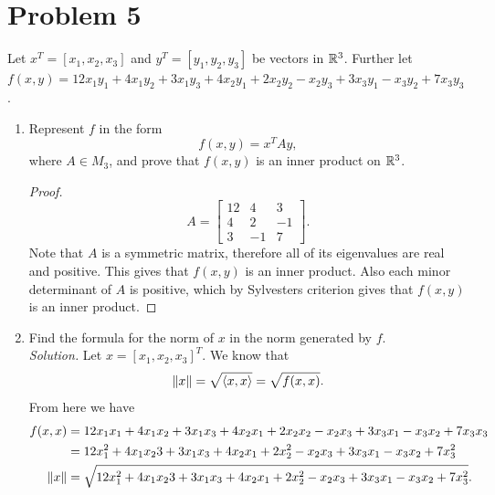 \documentclass[12pt]{article}
\begin{document}
\section*{Problem 5}
Let $x^T = [x_1, x_2, x_3]$ and $y^T = [y_1, y_2, y_3]$ be vectors in $\mathbb{R}^3$. Further let $f (x, y) = 12x_1y_1 +4x_1y_2 +3x_1y_3 +4x_2y_1 +2x_2y_2 -x_2y_3 +3x_3y_1 -x_3y_2 +7x_3y_3$.
\begin{enumerate}[label=(\alph*)]
    \item Represent $f$ in the form
    \[
        f(x,y)=x^TAy,
    \]
    where $A \in M_3$, and prove that $f (x, y)$ is an inner product on $\mathbb{R}^3$.
    \begin{proof}
        \[
            A=
            \begin{bmatrix}
                12&4&3\\
                4&2&-1\\
                3&-1&7
            \end{bmatrix}.
        \]
        Note that $A$ is a symmetric matrix, therefore all of its eigenvalues are real and positive. This gives that $f(x,y)$ is an inner product. Also each minor determinant of $A$ is positive, which by Sylvesters criterion gives that $f(x,y)$ is an inner product. 
    \end{proof}
    \item Find the formula for the norm of $x$ in the norm generated by $f$.\\
    \textit{Solution.} Let $x=[x_1,x_2,x_3]^T$. We know that 
    \[
        \| x \|=\sqrt{\left\langle x, x \right\rangle}=\sqrt{f(x,x)}.
    \]
    From here we have
    \begin{align*}
        f(x,x)&=12x_1x_1 +4x_1x_2 +3x_1x_3 +4x_2x_1 +2x_2x_2 -x_2x_3 +3x_3x_1 -x_3x_2 +7x_3x_3\\
        &=12x_1^2+4x_1x_23+3x_1x_3 +4x_2x_1 +2x_2^2 -x_2x_3 +3x_3x_1 -x_3x_2 +7x_3^2\\
        \| x \|&=\sqrt{12x_1^2+4x_1x_23+3x_1x_3 +4x_2x_1 +2x_2^2 -x_2x_3 +3x_3x_1 -x_3x_2 +7x_3^2}.
    \end{align*}
\end{enumerate}
\end{document}
